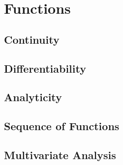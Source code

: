 \chapter{Functions}
\section{Continuity}
\section{Differentiability}
\section{Analyticity}
\section{Sequence of Functions}
\section{Multivariate Analysis}
